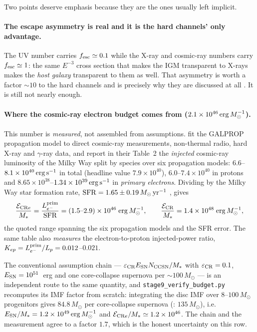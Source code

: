 \documentclass[11pt,a4paper]{article}
\begin{document}
Two points deserve emphasis because they are the ones usually left implicit.

\paragraph{The escape asymmetry is real and it is the hard channels' only
advantage.} The UV number carries $f_{\rm esc}\simeq0.1$ while the X-ray and
cosmic-ray numbers carry $f_{\rm esc}\simeq1$: the same $E^{-3}$ cross section
that makes the IGM transparent to X-rays makes the \emph{host galaxy}
transparent to them as well. That asymmetry is worth a factor $\sim10$ to the
hard channels and is precisely why they are discussed at all
\citep{oh01,mcquinn12}. It is still not nearly enough.

\paragraph{Where the cosmic-ray electron budget comes from
($2.1\times10^{46}\,{\rm erg}\,M_\odot^{-1}$).}
This number is \emph{measured}, not assembled from assumptions.
\citet{strong10} fit the GALPROP propagation model to direct cosmic-ray
measurements, non-thermal radio, hard X-ray and $\gamma$-ray data, and report
in their Table~2 the \emph{injected} cosmic-ray luminosity of the Milky Way
split by species over six propagation models: $6.6$--$8.1\times10^{40}\,
{\rm erg\,s^{-1}}$ in total (headline value $7.9\times10^{40}$),
$6.0$--$7.4\times10^{40}$ in protons and
$8.65\times10^{38}$--$1.34\times10^{39}\,{\rm erg\,s^{-1}}$ in
\emph{primary electrons}. Dividing by the Milky Way star formation rate,
${\rm SFR}=1.65\pm0.19\,M_\odot\,{\rm yr^{-1}}$ \citep{licquia15}, gives
\begin{equation}
  \frac{\mathcal{E}_{{\rm CR}e}}{M_\ast}
  = \frac{L_{e^-}^{\rm prim}}{\rm SFR}
  = (1.5\text{--}2.9)\times10^{46}\;{\rm erg}\,M_\odot^{-1},
  \qquad
  \frac{\mathcal{E}_{\rm CR}}{M_\ast} = 1.4\times10^{48}\;
  {\rm erg}\,M_\odot^{-1},
  \label{eq:crbudget}
\end{equation}
the quoted range spanning the six propagation models and the SFR error. The
same table also \emph{measures} the electron-to-proton injected-power ratio,
$K_{ep}=L_{e^-}^{\rm prim}/L_p = 0.012$--$0.021$.

The conventional assumption chain --- $\varepsilon_{\rm CR}E_{\rm SN}
N_{\rm CCSN}/M_\ast$ with $\varepsilon_{\rm CR}=0.1$, $E_{\rm SN}=10^{51}$~erg
and one core-collapse supernova per $\sim100\,M_\odot$ --- is an independent
route to the same quantity, and \texttt{stage9\_verify\_budget.py} recomputes
its IMF factor from scratch: integrating the \citet{chabrier03} disc IMF over
$8$--$100\,M_\odot$ progenitors gives $84.8\,M_\odot$ per core-collapse
supernova (\citealt{salpeter55}: $135\,M_\odot$), i.e.\
$E_{\rm SN}/M_\ast=1.2\times10^{49}\,{\rm erg}\,M_\odot^{-1}$ and
$\mathcal{E}_{{\rm CR}e}/M_\ast\simeq1.2\times10^{46}$. The chain and the
measurement agree to a factor $1.7$, which is the honest uncertainty on this
row.
\end{document}
